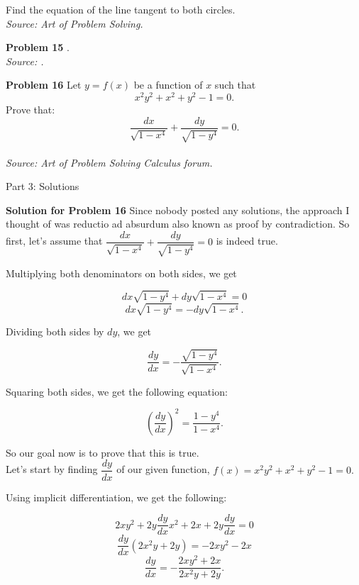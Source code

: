 \documentclass{article}
\begin{document}
    Find the equation of the line tangent to both circles.\\
\textit{Source: Art of Problem Solving.}

\vspace{1cm}

\textbf{Problem 15} .\\ 
\textit{Source: .}

\vspace{1cm}

\textbf{Problem 16} Let $y = f(x)$ be a function of $x$ such that
    \[x^2y^2 + x^2 + y^2 - 1 = 0.\]
Prove that:
    \[\dfrac {dx} {\sqrt{1 - x^4}} + \dfrac {dy} {\sqrt{1 - y^4}} = 0.\]
\\
\textit{Source: Art of Problem Solving Calculus forum.}

\newpage

\begin{comment}
    Implicit Differentiation Solutions
\end{comment}

\LARGE Part 3: Solutions

\vspace{2cm}

\large

\textbf{Solution for Problem 16} Since nobody posted any solutions, the approach I thought of was reductio ad absurdum also known as proof by contradiction. So first, let's assume that $\dfrac {dx} {\sqrt{1 - x^4}} + \dfrac {dy} {\sqrt{1 - y^4}} = 0$ is indeed true.

Multiplying both denominators on both sides, we get

    \[dx\sqrt{1 - y^4} + dy\sqrt{1 - x^4} = 0\]
    \[dx\sqrt{1 - y^4} = -dy\sqrt{1 - x^4}.\]

Dividing both sides by $dy$, we get

    \[\dfrac {dy} {dx} = -\dfrac {\sqrt{1 - y^4}} {\sqrt{1 - x^4}}.\]

Squaring both sides, we get the following equation:

    \[\left( \dfrac {dy} {dx} \right)^{2} = \dfrac {1 - y^4} {1 - x^4}.\]

So our goal now is to prove that this is true.\\

Let's start by finding $\dfrac {dy} {dx}$ of our given function, $f(x) = x^{2}y^{2} + x^{2} + y^{2} - 1 = 0.$

Using implicit differentiation, we get the following:

    \[ 2xy^{2} + 2y\frac {dy} {dx}x^{2} + 2x + 2y\frac {dy} {dx} = 0 \]
    \[ \frac {dy} {dx} \left( 2x^{2}y + 2y \right) = -2xy^{2} - 2x \]
    \[ \dfrac {dy} {dx} = -\dfrac {2xy^{2} + 2x} {2x^{2}y + 2y}. \]
\end{document}
